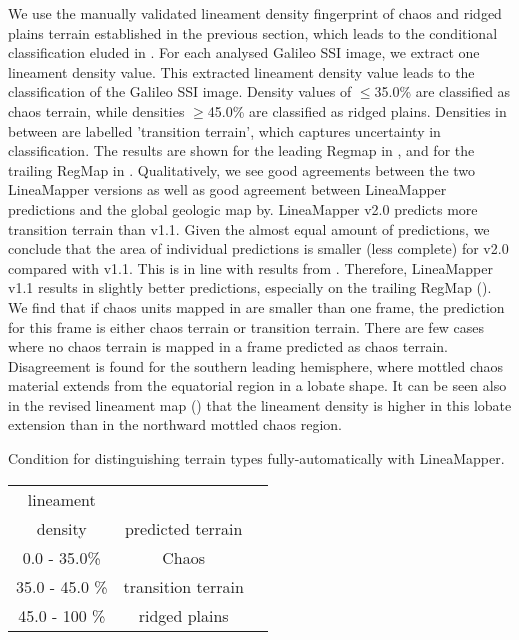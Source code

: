 We use the manually validated lineament density fingerprint of chaos and ridged plains terrain established in the previous section, which leads to the conditional classification eluded in . For each analysed Galileo SSI image, we extract one lineament density value. This extracted lineament density value leads to the classification of the Galileo SSI image. Density values of $\leq$35.0\% are classified as chaos terrain, while densities $\geq$45.0\% are classified as ridged plains. Densities in between are labelled 'transition terrain', which captures uncertainty in classification. The results are shown for the leading Regmap in , and for the trailing RegMap in . Qualitatively, we see good agreements between the two LineaMapper versions as well as good agreement between LineaMapper predictions and the global geologic map by. LineaMapper v2.0 predicts more transition terrain than v1.1. Given the almost equal amount of predictions, we conclude that the area of individual predictions is smaller (less complete) for v2.0 compared with v1.1. This is in line with results from . Therefore, LineaMapper v1.1 results in slightly better predictions, especially on the trailing RegMap (). We find that if chaos units mapped in are smaller than one frame, the prediction for this frame is either chaos terrain or transition terrain. There are few cases where no chaos terrain is mapped in a frame predicted as chaos terrain. Disagreement is found for the southern leading hemisphere, where mottled chaos material extends from the equatorial region in a lobate shape. It can be seen also in the revised lineament map () that the lineament density is higher in this lobate extension than in the northward mottled chaos region. 

\begin{margintable}[]\scriptsize
\caption{Condition for distinguishing terrain types fully-automatically with LineaMapper.}
\label{tab:condition_ch_pr}
\begin{tabular}{@{}ccc@{}}
\toprule
lineament \\ density & predicted terrain \\ \midrule
0.0 - 35.0\% & Chaos \\
35.0 - 45.0 \% & transition terrain \\
45.0 - 100 \% & ridged plains \\ \bottomrule
\end{tabular}
\end{margintable}

